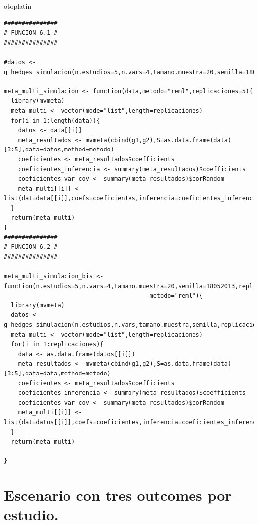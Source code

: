 otoplatin\documentclass[a4paper,openright,12pt]{report}
\begin{document}
{\begin{verbatim}
###############
# FUNCION 6.1 #
###############

#datos <- g_hedges_simulacion(n.estudios=5,n.vars=4,tamano.muestra=20,semilla=18052013,replicaciones=5,correlacion=0)

meta_multi_simulacion <- function(data,metodo="reml",replicaciones=5){
  library(mvmeta)
  meta_multi <- vector(mode="list",length=replicaciones)
  for(i in 1:length(data)){
    datos <- data[[i]]
    meta_resultados <- mvmeta(cbind(g1,g2),S=as.data.frame(data)[3:5],data=datos,method=metodo)
    coeficientes <- meta_resultados$coefficients
    coeficientes_inferencia <- summary(meta_resultados)$coefficients
    coeficientes_var_cov <- summary(meta_resultados)$corRandom
    meta_multi[[i]] <- list(dat=data[[i]],coefs=coeficientes,inferencia=coeficientes_inferencia,var_cov=coeficientes_var_cov)
  }
  return(meta_multi)  
}
###############
# FUNCION 6.2 #
###############

meta_multi_simulacion_bis <- function(n.estudios=5,n.vars=4,tamano.muestra=20,semilla=18052013,replicaciones=5,correlacion=0,
                                         metodo="reml"){
  library(mvmeta)
  datos <- g_hedges_simulacion(n.estudios,n.vars,tamano.muestra,semilla,replicaciones,correlacion)
  meta_multi <- vector(mode="list",length=replicaciones)
  for(i in 1:replicaciones){
    data <- as.data.frame(datos[[i]])
    meta_resultados <- mvmeta(cbind(g1,g2),S=as.data.frame(data)[3:5],data=data,method=metodo)
    coeficientes <- meta_resultados$coefficients
    coeficientes_inferencia <- summary(meta_resultados)$coefficients
    coeficientes_var_cov <- summary(meta_resultados)$corRandom
    meta_multi[[i]] <- list(dat=datos[[i]],coefs=coeficientes,inferencia=coeficientes_inferencia,var_cov=coeficientes_var_cov)
  }
  return(meta_multi)  
  
}
\end{verbatim}}

\section{Escenario con tres outcomes por estudio.}
\end{document}
